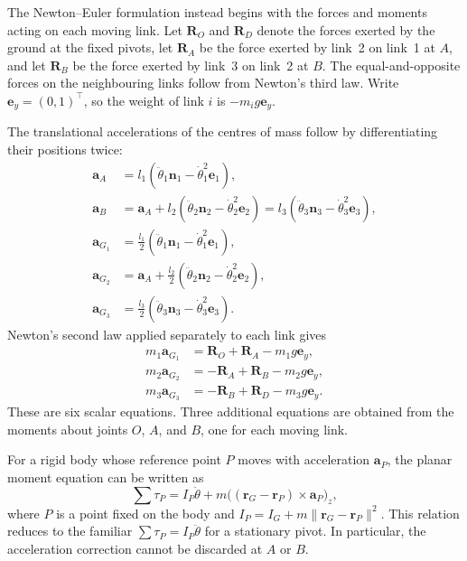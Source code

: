 The Newton--Euler formulation instead begins with the forces and moments acting on each moving link. Let $\mathbf R_O$ and $\mathbf R_D$ denote the forces exerted by the ground at the fixed pivots, let $\mathbf R_A$ be the force exerted by link~2 on link~1 at $A$, and let $\mathbf R_B$ be the force exerted by link~3 on link~2 at $B$. The equal-and-opposite forces on the neighbouring links follow from Newton's third law. Write $\mathbf e_y=(0,1)^\top$, so the weight of link $i$ is $-m_i g\mathbf e_y$.

The translational accelerations of the centres of mass follow by differentiating their positions twice:
\begin{align}
    \mathbf a_A&=l_1(\ddot\theta_1\mathbf n_1-\dot\theta_1^2\mathbf e_1),\\
    \mathbf a_B&=\mathbf a_A+l_2(\ddot\theta_2\mathbf n_2-\dot\theta_2^2\mathbf e_2)
                 =l_3(\ddot\theta_3\mathbf n_3-\dot\theta_3^2\mathbf e_3),\\
    \mathbf a_{G_1}&=\frac{l_1}{2}(\ddot\theta_1\mathbf n_1-\dot\theta_1^2\mathbf e_1),\\
    \mathbf a_{G_2}&=\mathbf a_A+\frac{l_2}{2}(\ddot\theta_2\mathbf n_2-\dot\theta_2^2\mathbf e_2),\\
    \mathbf a_{G_3}&=\frac{l_3}{2}(\ddot\theta_3\mathbf n_3-\dot\theta_3^2\mathbf e_3).
\end{align}
Newton's second law applied separately to each link gives
\begin{align}
    m_1\mathbf a_{G_1}&=\mathbf R_O+\mathbf R_A-m_1g\mathbf e_y,\\
    m_2\mathbf a_{G_2}&=-\mathbf R_A+\mathbf R_B-m_2g\mathbf e_y,\\
    m_3\mathbf a_{G_3}&=-\mathbf R_B+\mathbf R_D-m_3g\mathbf e_y.
    \label{eq:fourbar_newton_forces}
\end{align}
These are six scalar equations. Three additional equations are obtained from the moments about joints $O$, $A$, and $B$, one for each moving link.

For a rigid body whose reference point $P$ moves with acceleration $\mathbf a_P$, the planar moment equation can be written as
\begin{equation}
    \sum\tau_P
    =I_P\ddot\theta+m\bigl((\mathbf r_G-\mathbf r_P)\times\mathbf a_P\bigr)_z,
    \label{eq:fourbar_moving_pivot}
\end{equation}
where $P$ is a point fixed on the body and $I_P=I_G+m\lVert\mathbf r_G-\mathbf r_P\rVert^2$. This relation reduces to the familiar $\sum\tau_P=I_P\ddot\theta$ for a stationary pivot. In particular, the acceleration correction cannot be discarded at $A$ or $B$.

